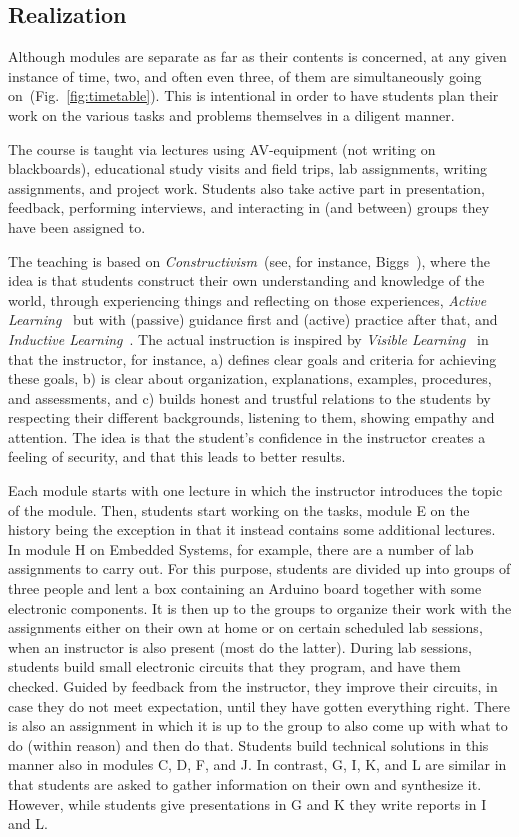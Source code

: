 \documentclass[conference]{IEEEtran}
\begin{document}
\subsection{Realization}

Although modules are separate as far as their contents is concerned, at any given instance of time, two, and often even three, of them are simultaneously going on~(Fig.~\ref{fig:timetable}). This is intentional in order to have students plan their work on the various tasks and problems themselves in a diligent manner. 

The course is taught via lectures using AV-equipment (not writing on blackboards), educational study visits and field trips, lab assignments, writing assignments, and project work. Students also take active part in presentation, feedback, performing interviews, and interacting in (and between) groups they have been assigned to. 

The teaching is based on \emph{Constructivism}~(see, for instance, Biggs~\cite{biggs-96}), where the idea is that students construct their own understanding and knowledge of the world, through experiencing things and reflecting on those experiences, \emph{Active Learning}~\cite{BonwellE91} but with (passive) guidance first and (active) practice after that, and \emph{Inductive Learning}~\cite{Prince06inductiveteaching}. The actual instruction is inspired by \emph{Visible Learning}~\cite{hattie2009visible} in that the instructor, for instance, a) defines clear goals and criteria for achieving these goals, b) is clear about organization, explanations, examples, procedures, and assessments, and c) builds honest and trustful relations to the students by respecting their different backgrounds, listening to them, showing empathy and attention. The idea is that the student's confidence in the instructor creates a feeling of security, and that this leads to better results. 

Each module starts with one lecture in which the instructor introduces the topic of the module. Then, students start working on the tasks, module E on the history being the exception in that it instead contains some additional lectures. In module H on Embedded Systems, for example, there are a number of lab assignments to carry out. For this purpose, students are divided up into groups of three people and lent a box containing an Arduino board together with some electronic components. It is then up to the groups to organize their work with the assignments either on their own at home or on certain scheduled lab sessions, when an instructor is also present (most do the latter). During lab sessions, students build small electronic circuits that they program, and have them checked. Guided by feedback from the instructor, they improve their circuits, in case they do not meet expectation, until they have gotten everything right. There is also an assignment in which it is up to the group to also come up with what to do (within reason) and then do that. 
Students build technical solutions in this manner also in modules C, D, F, and J. In contrast, G, I, K, and L are similar in that students are asked to gather information on their own and synthesize it. However, while students give presentations in G and K they write reports in I and L. 
\end{document}
